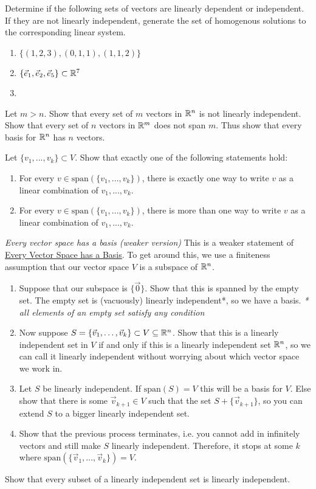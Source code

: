 \begin{exerciselist}
	\item Determine if the following sets of vectors are linearly dependent or independent. If they are not linearly independent, generate the set of homogenous solutions to the corresponding linear system. \begin{enumerate}[label=(\alph*)]
		\item $\{(1,2,3), (0,1,1),(1,1,2)\}$
		\item $\{\vec{e}_1,\vec{e}_2,\vec{e}_5\}\subset\mathbb{R}^7$
		\item 
	\end{enumerate}
	\item Let $m>n$. Show that every set of $m$ vectors in $\mathbb{R}^n$ is not linearly independent. Show that every set of $n$ vectors in $\mathbb{R}^m$ does not span $m$. Thus show that every basis for $\mathbb{R}^n$ has $n$ vectors.
	\item Let $\{v_1,...,v_k\}\subset V$. Show that exactly one of the following statements hold: \begin{enumerate}[label=(\alph*)]
		\item For every $v\in \textrm{span}(\{v_1,...,v_k\})$, there is exactly one way to write $v$ as a linear combination of $v_1,...,v_k$.
		\item For every $v\in \textrm{span}(\{v_1,...,v_k\})$, there is more than one way to write $v$ as a linear combination of $v_1,...,v_k$.
	\end{enumerate}
	\item \textit{Every vector space has a basis (weaker version)} This is a weaker statement of \href{thm:2.14}{Every Vector Space has a Basis}. To get around this, we use a finiteness assumption that our vector space $V$ is a subspace of $\mathbb{R}^n$.\begin{enumerate}[label=(\alph*)]
		\item Suppose that our subspace is $\{\vec{0}\}$. Show that this is spanned by the empty set. The empty set is (vacuously) linearly independent*, so we have a basis. \textit{* all elements of an empty set satisfy any condition}
		\item Now suppose $S=\{\vec{v}_1,\ldots,\vec{v}_k\}\subset V\subseteq \mathbb{R}^n$. Show that this is a linearly independent set in $V$ if and only if this is a linearly independent set $\mathbb{R}^n$, so we can call it linearly independent without worrying about which vector space we work in.
		\item Let $S$ be linearly independent. If $\textrm{span}(S)=V$ this will be a basis for $V$. Else show that there is some $\vec{v}_{k+1}\in V$ such that the set $S+\{\vec{v}_{k+1}\}$, so you can extend $S$ to a bigger linearly independent set.
		\item Show that the previous process terminates, i.e. you cannot add in infinitely vectors and still make $S$ linearly independent. Therefore, it stops at some $k$ where $\textrm{span}(\{\vec{v}_1,\ldots,\vec{v}_k\})=V$.
	\end{enumerate}
	\item Show that every subset of a linearly independent set is linearly independent.
	\item 
\end{exerciselist}

